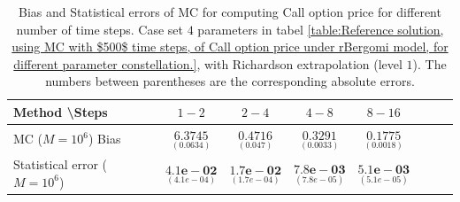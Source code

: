 \documentclass[11pt]{article}
\begin{document}
\begin{table}[h!]
	\centering
	\begin{tabular}{l*{6}{c}r}
		Method \textbackslash  Steps            & $1-2$ & $2-4$ & $4-8$ & $8-16$  \\
		\hline
		MC  ($M=10^6$) Bias   &$\underset{(0.0634 )}{\mathbf{6.3745}}$  & $\underset{(0.047)}{\mathbf{0.4716}}$  & $\underset{( 0.0033 )}{\mathbf{0.3291}}$  & $\underset{( 0.0018)}{\mathbf{0.1775}}$ \\	
		
		Statistical error ($M=10^6$)   & $\underset{(  4.1e-04)}{\mathbf{4.1e-02}}$  & $\underset{(1.7e-04 )}{\mathbf{1.7e-02}}$  & $\underset{(7.8e-05)}{\mathbf{7.8e-03}}$ & $\underset{(5.1e-05 )}{\mathbf{5.1e-03}}$ \\	
		
		\hline
	\end{tabular}
	\caption{Bias and Statistical errors of MC   for computing Call option price  for different number of time steps. Case set $4$ parameters in tabel \ref{table:Reference solution, using MC with $500$ time steps, of Call option price under rBergomi model, for different parameter constellation.}, with Richardson extrapolation (level $1$). The numbers between parentheses are the corresponding absolute errors.}
	\label{Bias and Statistical errors of MC ($M=10^6$)  for computing Call option price  for different number of time steps. Case set $4$ parameters, with Richardson extrapolation (level1). The numbers between parentheses are the corresponding absolute errors.}
\end{table}
\end{document}
